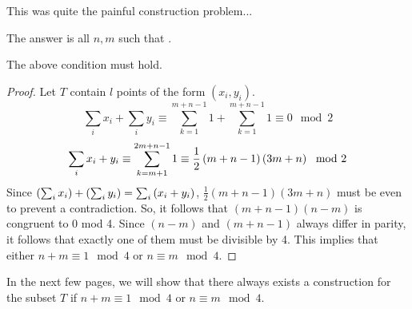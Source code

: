\documentclass[10pt]{../usamts}
\begin{document}
\begin{solution}
This was quite the painful construction problem...

The answer is all $n,m$ such that .

\begin{claim}
    The above condition must hold.
\end{claim}
\begin{proof}
    Let $T$ contain $l$ points of the form $(x_i,y_i)$.
    $$\sum_i x_i + \sum_i y_i \equiv \sum_{k=1}^{m+n-1} 1 + \sum_{k=1}^{m+n-1} 1 \equiv 0 \mod 2$$
    $$\sum_i x_i + y_i \equiv \sum_{k=m+1}^{2m+n-1} 1 \equiv \frac{1}{2} \left( m+n-1 \right)\left( 3m+n \right) \mod 2$$
    Since $\left( \sum_i x_i \right) + \left( \sum_i y_i \right) = \sum_i \left( x_i+y_i \right)$, $\frac{1}{2} (m+n-1)(3m+n)$ must be even to prevent a contradiction.
    So, it follows that $(m+n-1)(n-m)$ is congruent to 0 mod 4. Since $(n-m)$ and $(m+n-1)$ always differ in parity, it follows that exactly one of them must be divisible by 4. This implies that either $n+m \equiv 1 \mod 4$ or $n \equiv m \mod 4$.
\end{proof}

\newcommand{\mainaxis}{
    Select the points on the main axis so that each diagonal intersects exactly one point:
    \begin{enumerate}
        \item Select all the points of the form $(m, m+2k-1)$ for $1 \leq k \leq \floor{\frac{n}{2}}$
        \item Select all the points of the form $(m, m-2k)$ for $1 \leq k \leq \floor{\frac{m-1}{2}}$
        \item Select all the points of the form $(m+2k, m)$ for $1 \leq k \leq \floor{\frac{n-1}{2}}$
        \item Select all the points of the form $(m-2k+1, m)$ for $1 \leq k \leq \floor{\frac{m}{2}}$
    \end{enumerate}
}

In the next few pages, we will show that there always exists a construction for the subset $T$ if $n+m \equiv 1 \mod 4$ or $n \equiv m \mod 4$.


\end{solution}
\end{document}
